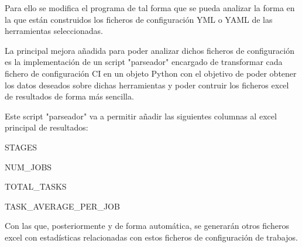 Para ello se modifica el programa de tal forma que se pueda analizar la forma en la que están construidos los ficheros de configuración YML o YAML de las herramientas seleccionadas.

La principal mejora añadida para poder analizar dichos ficheros de configuración es la implementación de un script "parseador" encargado de transformar cada fichero de configuración CI en un objeto Python con el objetivo de poder obtener los datos deseados sobre dichas herramientas y poder contruir los ficheros excel de resultados de forma más sencilla.

Este script "parseador" va a permitir añadir las siguientes columnas al excel principal de resultados:
\begin{compactitem}
    \item STAGES
    \item NUM\_JOBS
    \item TOTAL\_TASKS
    \item TASK\_AVERAGE\_PER\_JOB
\end{compactitem}

Con las que, posteriormente y de forma automática, se generarán otros ficheros excel con estadísticas relacionadas con estos ficheros de configuración de trabajos.

